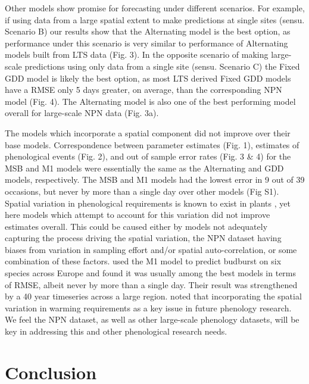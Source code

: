 \documentclass[fleqn,10pt,lineno]{wlpeerj} %
\begin{document}
Other models show promise for forecasting under different scenarios. For example, if using data from a large spatial extent to make predictions at single sites (sensu. Scenario B) our results show that the Alternating model is the best option, as performance under this scenario is very similar to performance of Alternating models built from LTS data (Fig. 3). In the opposite scenario of making large-scale predictions using only data from a single site (sensu. Scenario C) the Fixed GDD model is likely the best option, as most LTS derived Fixed GDD models have a RMSE only 5 days greater, on average, than the corresponding NPN model (Fig. 4). The Alternating model is also one of the best performing model overall for large-scale NPN data (Fig. 3a). 

The models which incorporate a spatial component did not improve over their base models. Correspondence between parameter estimates (Fig. 1), estimates of phenological events (Fig. 2), and out of sample error rates (Fig. 3 & 4) for the MSB and M1 models were essentially the same as the Alternating and GDD models, respectively. The MSB and M1 models had the lowest error in 9 out of 39 occasions, but never by more than a single day over other models (Fig S1). Spatial variation in phenological requirements is known to exist in plants \citep{zhang2017}, yet here models which attempt to account for this variation did not improve estimates overall. This could be caused either by models not adequately capturing the process driving the spatial variation, the NPN dataset having biases from variation in sampling effort and/or spatial auto-correlation, or some combination of these factors. \cite{basler2016} used the M1 model to predict budburst on six species across Europe and found it was usually among the best models in terms of RMSE, albeit never by more than a single day. Their result was strengthened by a 40 year timeseries across a large region. \cite{chuine2017} noted that incorporating the spatial variation in warming requirements as a key issue in future phenology research. We feel the NPN dataset, as well as other large-scale phenology datasets, will be key in addressing this and other phenological research needs. 

\section*{Conclusion}
\end{document}
